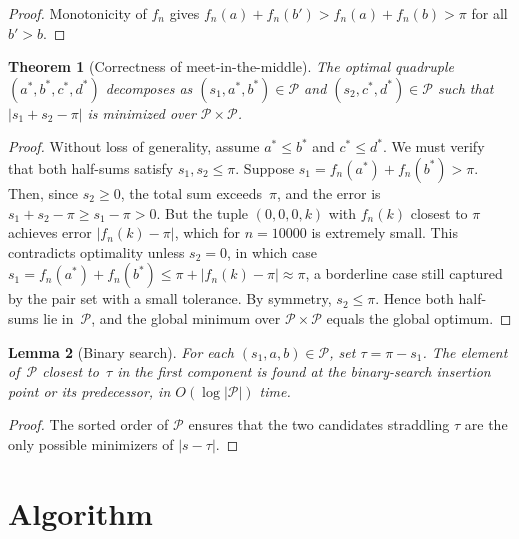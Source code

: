 \documentclass[11pt]{article}
\newtheorem{theorem}{Theorem}
\newtheorem{lemma}[theorem]{Lemma}
\begin{document}
\begin{proof}
Monotonicity of $f_n$ gives $f_n(a) + f_n(b') > f_n(a) + f_n(b) > \pi$ for all $b' > b$.
\end{proof}

\begin{theorem}[Correctness of meet-in-the-middle]
\label{thm:mitm}
The optimal quadruple $(a^*, b^*, c^*, d^*)$ decomposes as $(s_1, a^*, b^*) \in \mathcal{P}$ and $(s_2, c^*, d^*) \in \mathcal{P}$ such that $|s_1 + s_2 - \pi|$ is minimized over $\mathcal{P} \times \mathcal{P}$.
\end{theorem}

\begin{proof}
Without loss of generality, assume $a^* \le b^*$ and $c^* \le d^*$. We must verify that both half-sums satisfy $s_1, s_2 \le \pi$. Suppose $s_1 = f_n(a^*) + f_n(b^*) > \pi$. Then, since $s_2 \ge 0$, the total sum exceeds~$\pi$, and the error is $s_1 + s_2 - \pi \ge s_1 - \pi > 0$. But the tuple $(0,0,0,k)$ with $f_n(k)$ closest to $\pi$ achieves error $|f_n(k) - \pi|$, which for $n = 10000$ is extremely small. This contradicts optimality unless $s_2 = 0$, in which case $s_1 = f_n(a^*) + f_n(b^*) \le \pi + |f_n(k) - \pi| \approx \pi$, a borderline case still captured by the pair set with a small tolerance. By symmetry, $s_2 \le \pi$. Hence both half-sums lie in~$\mathcal{P}$, and the global minimum over $\mathcal{P} \times \mathcal{P}$ equals the global optimum.
\end{proof}

\begin{lemma}[Binary search]
\label{lem:bsearch}
For each $(s_1, a, b) \in \mathcal{P}$, set $\tau = \pi - s_1$. The element of~$\mathcal{P}$ closest to~$\tau$ in the first component is found at the binary-search insertion point or its predecessor, in $O(\log |\mathcal{P}|)$ time.
\end{lemma}

\begin{proof}
The sorted order of $\mathcal{P}$ ensures that the two candidates straddling $\tau$ are the only possible minimizers of $|s - \tau|$.
\end{proof}

\section{Algorithm}
\end{document}
